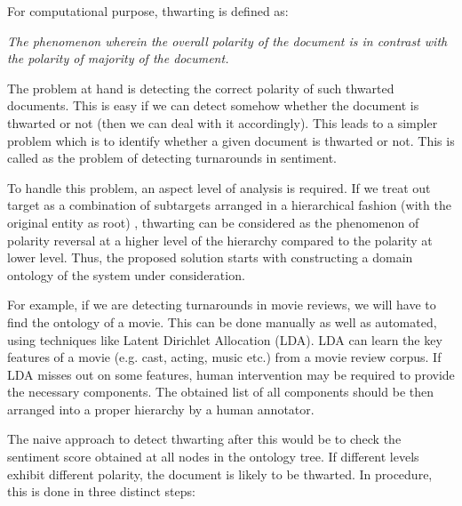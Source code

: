 For computational purpose, thwarting is defined as:

\vspace{8mm}

\textit{The phenomenon wherein the overall polarity of
the document is in contrast with the polarity of
majority of the document.}

\vspace{8mm}

The problem at hand is detecting the correct polarity of such thwarted documents. This is easy if we can detect somehow whether the document is
thwarted or not (then we can deal with it accordingly). This leads to a simpler problem which is to identify whether a given document is thwarted or not. 
This is called as the problem of detecting turnarounds in sentiment.


\vspace{8mm}

To handle this problem, an aspect level of analysis is required. If we treat out target as a combination of subtargets arranged in a hierarchical fashion (with the original entity as root)
, thwarting can be considered as the phenomenon of polarity reversal at a higher level of the hierarchy compared to the polarity at lower level. Thus, the proposed solution
starts with constructing a domain ontology of the system under consideration.

\vspace{8mm}

For example, if we are detecting turnarounds in movie reviews, we will have to find the ontology of a movie. This can be done manually as well as automated, using techniques
like Latent Dirichlet Allocation (LDA). LDA can learn the key features of a movie (e.g. cast, acting, music etc.) from a movie review corpus. If LDA misses out on some
features, human intervention may be required to provide the necessary components. The obtained list of all components should be then arranged into a proper hierarchy by a
human annotator.


The naive approach to detect thwarting after this would be to check the sentiment score obtained at all nodes in the ontology tree. If different levels exhibit different polarity,
the document is likely to be thwarted. In procedure, this is done in three distinct steps:

